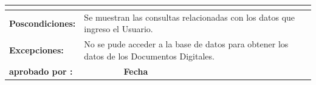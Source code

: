 \begin{center}
\begin{longtable}{|p{3cm}|p{3cm}|p{3cm}|p{3cm}|}
{\begin{itemize}
 \end{itemize}
 }\\
\hline
\bf Poscondiciones: &\multicolumn{3}{|p{9cm}|}{Se muestran las consultas relacionadas con los datos que ingreso el Usuario.} \\
\hline
\bf Excepciones: &\multicolumn{3}{|p{9cm}|}{No se pude acceder a la base de datos para obtener los datos de los Documentos Digitales.} \\
\hline
\bf aprobado por : &   & \bf Fecha &  \\
\hline
\end{longtable}
\end{center}
% 
